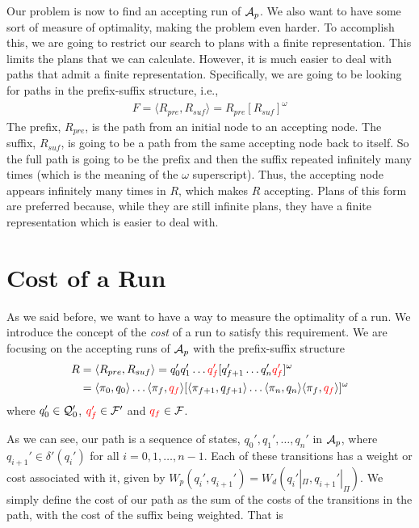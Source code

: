 Our problem is now to find an accepting run of $\mathcal{A}_p$. We also want to have some sort of measure of optimality, making the problem even harder. To accomplish this, we are going to restrict our search to plans with a finite representation. This limits the plans that we can calculate. However, it is much easier to deal with paths that admit a finite representation. Specifically, we are going to be looking for paths in the prefix-suffix structure, i.e.,\
\begin{align*}
F = \langle R_{pre}, R_{suf} \rangle = R_{pre} [R_{suf}]^\omega
\end{align*}
The prefix, $R_{pre}$, is the path from an initial node to an accepting node. The suffix, $R_{suf}$, is going to be a path from the same accepting node back to itself. So the full path is going to be the prefix and then the suffix repeated infinitely many times (which is the meaning of the $\omega$ superscript). Thus, the accepting node appears infinitely many times in $R$, which makes $R$ accepting. Plans of this form are preferred because, while they are still infinite plans, they have a finite representation which is easier to deal with.

\section{Cost of a Run}
As we said before, we want to have a way to measure the optimality of a run. We introduce the concept of the \textit{cost} of a run to satisfy this requirement. We are focusing on the accepting runs of $\mathcal{A}_p$ with the prefix-suffix structure
\begin{align*}
R &= \langle R_{pre}, R_{suf} \rangle = q_0' q_1' \dots {\color{red} q_f'} [q_{f+1}' \dots q_n' {\color{red} q_f'}]^\omega \\
&= \langle \pi_0, q_0 \rangle \dots   \langle {\color{black} \pi_f} , {\color{red} q_f} \rangle [ \langle \pi_{f+1} , q_{f+1} \rangle \dots \langle \pi_{n}, q_n \rangle \langle {\color{black} \pi_f} , {\color{red} q_f} \rangle ]^\omega
\end{align*} 
where $q_0' \in \mathcal{Q}_0'$, ${\color{red} q_f'} \in \mathcal{F}'$ and ${\color{red} q_f} \in \mathcal{F}$. 

As we can see, our path is a sequence of states, $q_0',q_1',\dots,q_n'$ in $\mathcal{A}_p$, where $q_{i+1}' \in \delta' (q_i')$ for all $i=0,1, \dots, n-1$. Each of these transitions has a weight or cost associated with it, given by $W_p(q_i',q_{i+1}') = W_d(q_i'|_\Pi , q_{i+1}'|_\Pi)$. We simply define the cost of our path as the sum of the costs of the transitions in the path, with the cost of the suffix being weighted. That is


